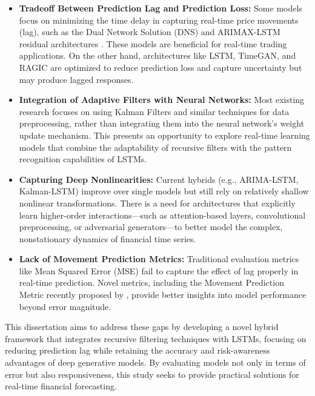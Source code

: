 \begin{itemize}
    \item \textbf{Tradeoff Between Prediction Lag and Prediction Loss:} Some models focus on minimizing the time delay in capturing real-time price movements (lag), such as the Dual Network Solution (DNS) and ARIMAX-LSTM residual architectures \parencite{samanta_dual_2020}. These models are beneficial for real-time trading applications. On the other hand, architectures like LSTM, TimeGAN, and RAGIC are optimized to reduce prediction loss and capture uncertainty but may produce lagged responses.

    \item \textbf{Integration of Adaptive Filters with Neural Networks:} Most existing research focuses on using Kalman Filters and similar techniques for data preprocessing, rather than integrating them into the neural network's weight update mechanism. This presents an opportunity to explore real-time learning models that combine the adaptability of recursive filters with the pattern recognition capabilities of LSTMs.

    \item \textbf{Capturing Deep Nonlinearities:} Current hybrids (e.g., ARIMA-LSTM, Kalman-LSTM) improve over single models but still rely on relatively shallow nonlinear transformations. There is a need for architectures that explicitly learn higher-order interactions—such as attention-based layers, convolutional preprocessing, or adversarial generators—to better model the complex, nonstationary dynamics of financial time series.

    \item \textbf{Lack of Movement Prediction Metrics:} Traditional evaluation metrics like Mean Squared Error (MSE) fail to capture the effect of lag properly in real-time prediction. Novel metrics, including the Movement Prediction Metric recently proposed by \textcite{samanta_dual_2020}, provide better insights into model performance beyond error magnitude.
\end{itemize}

This dissertation aims to address these gaps by developing a novel hybrid framework that integrates recursive filtering techniques with LSTMs, focusing on reducing prediction lag while retaining the accuracy and risk-awareness advantages of deep generative models. By evaluating models not only in terms of error but also responsiveness, this study seeks to provide practical solutions for real-time financial forecasting.